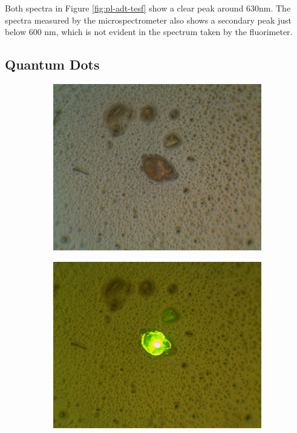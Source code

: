 Both spectra in Figure \ref{fig:pl-adt-tesf} show a clear peak around 630nm. The spectra measured by the microspectrometer also shows a secondary peak just below 600 nm, which is not evident in the spectrum taken by the fluorimeter. \cite{lam_polarization_2018}\cite{ostroverkhova_organic_2016}\cite{platt_optical_2009}


\subsection{ Quantum Dots}

\begin{figure}[H]
    \centering
    \begin{subfigure}[b]{0.45\textwidth}
        \includegraphics[width=\textwidth]{./img/qd-white-illum.png}
        \caption{}
        \label{img:qd-white}
    \end{subfigure}
    \hfill
    \begin{subfigure}[b]{0.45\textwidth}
        \includegraphics[width=\textwidth]{./img/qd-laser-illum.png}

\end{subfigure}
\end{figure}
